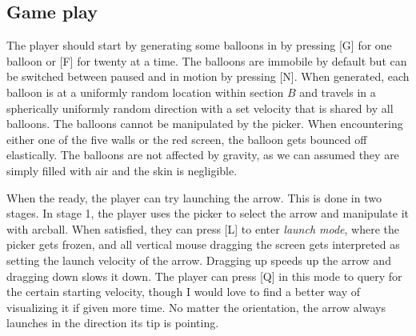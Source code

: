 \documentclass{article}[12pt]
\begin{document}
\subsection{Game play}

The player should start by generating some balloons in  by pressing [G] for one balloon or [F] for twenty at a time. The balloons are immobile by default but can be switched between paused and in motion by pressing [N]. When generated, each balloon is at a uniformly random location within section $B$ and travels in a spherically uniformly random direction with a set velocity that is shared by all balloons. The balloons cannot be manipulated by the picker. 
When encountering either one of the five walls or the red screen, the balloon gets bounced off elastically. The balloons are not affected by gravity, as we can assumed they are simply filled with air and the skin is negligible.

When the ready, the player can try launching the arrow. This is done in two stages. In stage 1, the player uses the picker to select the arrow and manipulate it with arcball. When satisfied, they can press [L] to enter \emph{launch mode}, where the picker gets frozen, and all vertical mouse dragging the screen gets interpreted as setting the launch velocity of the arrow. Dragging up speeds up the arrow and dragging down slows it down. The player can press [Q] in this mode to query for the certain starting velocity, though I would love to find a better way of visualizing it if given more time. No matter the orientation, the arrow always launches in the direction its tip is pointing. 
\end{document}
